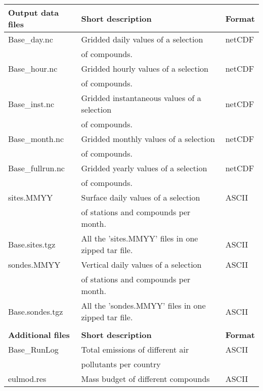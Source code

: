\begin{table}[h!]
\begin{center}
\hspace{-1cm}
\begin{tabular}{lll}
\hline
{\bf Output data files} &  {\bf Short description} & {\bf Format}\\
\hline
    Base\_day.nc & Gridded daily values of a selection & netCDF\\
&   of compounds.& \\ 
    Base\_hour.nc &Gridded hourly values of a selection &
    netCDF\\  
 &  of compounds.& \\
    Base\_inst.nc &Gridded instantaneous values of a selection
     & netCDF\\
 &  of compounds.& \\
    Base\_month.nc & Gridded monthly values of a selection&
    netCDF\\
 &  of compounds.& \\
    Base\_fullrun.nc & Gridded yearly values of a selection&
    netCDF\\
 &  of compounds. & \\
    sites.MMYY & Surface daily values of a selection&  ASCII\\
 & of stations and compounds per month.& \\
    Base.sites.tgz & All the 'sites.MMYY' files in one zipped tar file. & ASCII\\
    sondes.MMYY & Vertical daily values of a selection& ASCII\\
 &  of stations and compounds per month.& \\
    Base.sondes.tgz& All the 'sondes.MMYY' files in one zipped tar file.& ASCII\\ 
& &\\ \hline
{\bf Additional files} &  {\bf Short description} & {\bf Format}\\
    Base\_RunLog & Total emissions of different air   & ASCII\\
 & pollutants per country& \\
eulmod.res & Mass budget of different compounds & ASCII\\
 
\hline
\end{tabular}
\end{center}

\label{Tab:outputs}
\end{table}


